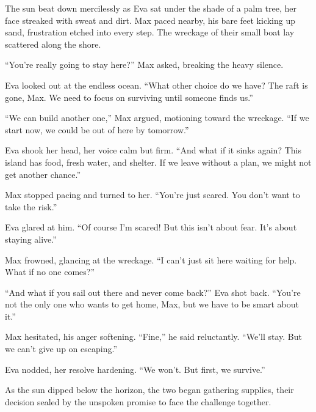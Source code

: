 \documentclass[12pt]{article}
\begin{document}
\begin{tcolorbox}[colframe=black!60, colback=white, 
coltitle=black, colbacktitle=black!15, fonttitle=\bfseries\Large, 
title=Text: The Decision, halign title=center, left=10pt, right=10pt, top=10pt, bottom=15pt]

The sun beat down mercilessly as Eva sat under the shade of a palm tree, her face streaked with sweat and dirt. Max paced nearby, his bare feet kicking up sand, frustration etched into every step. The wreckage of their small boat lay scattered along the shore.

“You’re really going to stay here?” Max asked, breaking the heavy silence.

Eva looked out at the endless ocean. “What other choice do we have? The raft is gone, Max. We need to focus on surviving until someone finds us.”

“We can build another one,” Max argued, motioning toward the wreckage. “If we start now, we could be out of here by tomorrow.”

Eva shook her head, her voice calm but firm. “And what if it sinks again? This island has food, fresh water, and shelter. If we leave without a plan, we might not get another chance.”

Max stopped pacing and turned to her. “You’re just scared. You don’t want to take the risk.”

Eva glared at him. “Of course I’m scared! But this isn’t about fear. It’s about staying alive.”

Max frowned, glancing at the wreckage. “I can’t just sit here waiting for help. What if no one comes?”

“And what if you sail out there and never come back?” Eva shot back. “You’re not the only one who wants to get home, Max, but we have to be smart about it.”

Max hesitated, his anger softening. “Fine,” he said reluctantly. “We’ll stay. But we can’t give up on escaping.”

Eva nodded, her resolve hardening. “We won’t. But first, we survive.”

As the sun dipped below the horizon, the two began gathering supplies, their decision sealed by the unspoken promise to face the challenge together.

 

\end{tcolorbox}

\vspace{1em}
\end{document}
